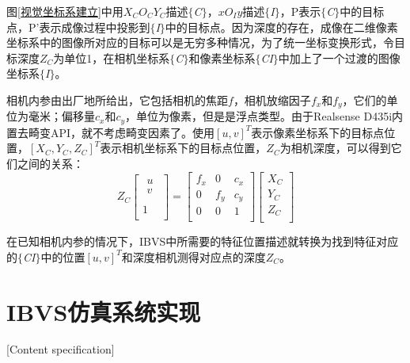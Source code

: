 \documentclass[fontset=fandol,type=bachelor,campus=harbin]{hithesisbook}
\begin{document}
图\ref{视觉坐标系建立}中用$X_CO_CY_C$描述$\lbrace$\textit{C}$\rbrace$，$xO_Iy$描述$\lbrace$\textit{I}$\rbrace$，P表示$\lbrace$\textit{C}$\rbrace$中的目标点，P'表示成像过程中投影到$\lbrace$\textit{I}$\rbrace$中的目标点。因为深度的存在，成像在二维像素坐标系中的图像所对应的目标可以是无穷多种情况，为了统一坐标变换形式，令目标深度$Z_C$为单位1，在相机坐标系$\lbrace$\textit{C}$\rbrace$和像素坐标系$\lbrace$\textit{CI}$\rbrace$中加上了一个过渡的图像坐标系$\lbrace$\textit{I}$\rbrace$。


相机内参由出厂地所给出，它包括相机的焦距$f$，相机放缩因子$f_x$和$f_y$，它们的单位为毫米；偏移量$c_x$和$c_y$，单位为像素，但是是浮点类型。由于Realsense D435i内置去畸变API，就不考虑畸变因素了。使用$\left[ u,v \right] ^T$表示像素坐标系下的目标点位置，$\left[ X_C,Y_C,Z_C \right] ^T$表示相机坐标系下的目标点位置，$Z_C$为相机深度，可以得到它们之间的关系：
\begin{equation}
	Z_C\left[ \begin{array}{c}
	\begin{array}{c}
	u\\
	v\\
\end{array}\\
	1\\
\end{array} \right] =\left[ \begin{matrix}
	f_x&		0&		c_x\\
	0&		f_y&		c_y\\
	0&		0&		1\\
\end{matrix} \right] \left[ \begin{array}{c}
	X_C\\
	Y_C\\
	Z_C\\
\end{array} \right] 
\label{像素到相机坐标变换} 
\end{equation} 


在已知相机内参的情况下，IBVS中所需要的特征位置描述就转换为找到特征对应的$\lbrace$\textit{CI}$\rbrace$中的位置$\left[ u,v \right] ^T$和深度相机测得对应点的深度$Z_C$。

\section{IBVS仿真系统实现}[Content specification]
\end{document}
